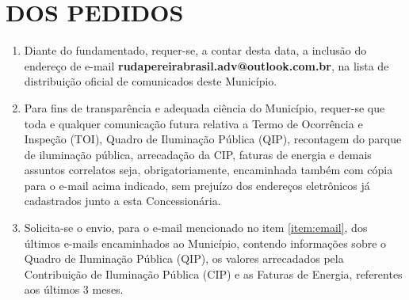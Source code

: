  


\newcommand{\Peticao}{PETIÇÃO PARA INCLUSÃO DE E-MAIL PARA RECEBIMENTO DE COMUNICADOS OFICIAIS}
\newcommand{\NumeroDoc}{001}



\renewcommand{\ExibirUnidadeConsumidora}{0}





\section{DOS PEDIDOS}

\begin{enumerate}[resume]
  \item Diante do fundamentado, requer-se, a contar desta data, a inclusão do endereço de e-mail \textbf{rudapereirabrasil.adv@outlook.com.br}, na lista de distribuição oficial de comunicados deste Município.
  \label{item:email}
  \item Para fins de transparência e adequada ciência do Município, requer-se que toda e qualquer comunicação futura relativa a Termo de Ocorrência e Inspeção (TOI), Quadro de Iluminação Pública (QIP), recontagem do parque de iluminação pública, arrecadação da CIP, faturas de energia e demais assuntos correlatos seja, obrigatoriamente, encaminhada também com cópia para o e-mail acima indicado, sem prejuízo dos endereços eletrônicos já cadastrados junto a esta Concessionária. 
  \item Solicita-se o envio, para o e-mail mencionado no item \ref{item:email}, dos últimos e-mails encaminhados ao Município, contendo informações sobre o Quadro de Iluminação Pública (QIP), os valores arrecadados pela Contribuição de Iluminação Pública (CIP) e as Faturas de Energia, referentes aos últimos 3 meses.
\end{enumerate}





